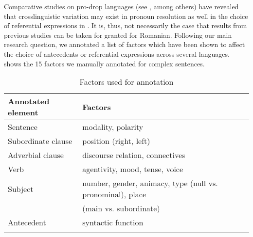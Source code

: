 \documentclass[output=paper,colorlinks,citecolor=brown]{langscibook}
\begin{document}
Comparative studies on pro-drop languages (see \citealt{contemori2021microvariation, torregrossa2020variation}, among others) have revealed that crosslinguistic variation may exist in pronoun resolution as well in the choice of referential expressions in . It is, thus, not necessarily the case that results from previous studies can be taken for granted for Romanian. Following our main research question, we annotated a list of factors which have been shown to affect the choice of antecedents or referential expressions across several languages.   shows the 15 factors we manually annotated for complex sentences. 

\begin{table}
\caption{Factors used for annotation}
\label{tab:myname:annot_fact:Istrate}
\begin{tabularx}{1.0\textwidth}{XX}
 \lsptoprule
 Annotated element & Factors\\
  \midrule
Sentence & modality, polarity\\ %
Subordinate clause & position (right, left) \\ %
Adverbial clause & discourse relation, connectives \\ %
Verb & agentivity, mood, tense, voice\\ %
Subject & number, gender, animacy, type (null vs. pronominal), place \\  
& (main vs. subordinate) \\ %
Antecedent & syntactic function \\   \lspbottomrule
\end{tabularx}
\end{table}
\end{document}
